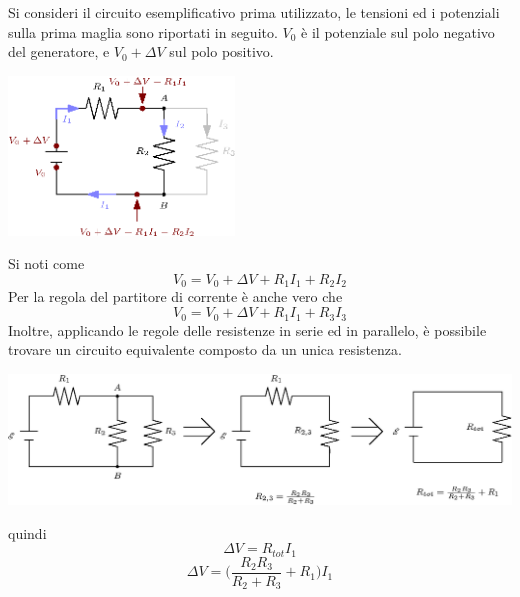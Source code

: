 \documentclass[10pt, letterpaper]{report}
\begin{document}
Si consideri il circuito esemplificativo prima utilizzato, le tensioni ed i potenziali sulla prima maglia sono riportati in seguito. $V_0$ è il potenziale sul polo negativo del generatore, e $V_0+\Delta V$ sul polo positivo.\begin{center}
    \includegraphics[width=0.45\textwidth]{images/potenzialiSulCircuito.eps}
\end{center}
Si noti come 
$$ V_0=V_0+\Delta V + R_1I_1+R_2I_2$$
Per la regola del partitore di corrente è anche vero che 
$$ V_0=V_0+\Delta V + R_1I_1+R_3I_3$$
Inoltre, applicando le regole delle resistenze in serie ed in parallelo, è possibile trovare un circuito equivalente composto da un unica resistenza.\begin{center}
    \includegraphics[width=1\textwidth]{images/circuitoEquivalente.eps}
\end{center}
quindi 
$$ \Delta V = R_{tot}I_1$$
$$ \Delta V = \Big(\frac{R_2R_3}{R_2+R_3}+R_1\Big)I_1$$
\flowerLine 
\end{document}
